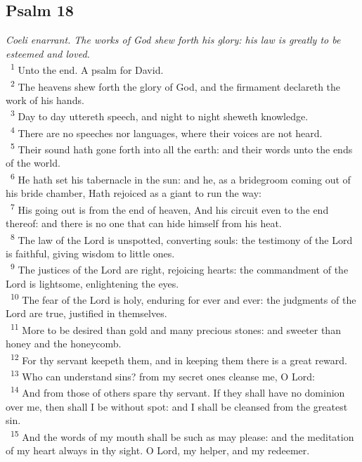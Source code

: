 \documentclass[a5paper,12pt]{article}
\begin{document}
\begin{multicols*}{2}
\section{Psalm 18}
\label{sec:org563c8e4}
\emph{Coeli enarrant. The works of God shew forth his glory: his law is greatly to be esteemed and loved.}\\

~\textsuperscript{1} Unto the end. A psalm for David.\\
~\textsuperscript{2} The heavens shew forth the glory of God, and the firmament declareth the work of his hands.\\
~\textsuperscript{3} Day to day uttereth speech, and night to night sheweth knowledge.\\
~\textsuperscript{4} There are no speeches nor languages, where their voices are not heard.\\
~\textsuperscript{5} Their sound hath gone forth into all the earth: and their words unto the ends of the world.\\
~\textsuperscript{6} He hath set his tabernacle in the sun: and he, as a bridegroom coming out of his bride chamber, Hath rejoiced as a giant to run the way:\\
~\textsuperscript{7} His going out is from the end of heaven, And his circuit even to the end thereof: and there is no one that can hide himself from his heat.\\
~\textsuperscript{8} The law of the Lord is unspotted, converting souls: the testimony of the Lord is faithful, giving wisdom to little ones.\\
~\textsuperscript{9} The justices of the Lord are right, rejoicing hearts: the commandment of the Lord is lightsome, enlightening the eyes.\\
~\textsuperscript{10} The fear of the Lord is holy, enduring for ever and ever: the judgments of the Lord are true, justified in themselves.\\
~\textsuperscript{11} More to be desired than gold and many precious stones: and sweeter than honey and the honeycomb.\\
~\textsuperscript{12} For thy servant keepeth them, and in keeping them there is a great reward.\\
~\textsuperscript{13} Who can understand sins? from my secret ones cleanse me, O Lord:\\
~\textsuperscript{14} And from those of others spare thy servant. If they shall have no dominion over me, then shall I be without spot: and I shall be cleansed from the greatest sin.\\
~\textsuperscript{15} And the words of my mouth shall be such as may please: and the meditation of my heart always in thy sight. O Lord, my helper, and my redeemer.\\


\end{multicols*}
\end{document}
